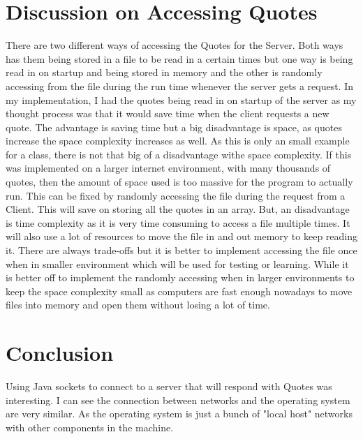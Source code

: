 \documentclass[twoside,twocolumn]{article}
\begin{document}

\section{Discussion on Accessing Quotes}
There are two different ways of accessing the Quotes for the Server. Both ways has them being stored in a file to be read in a certain times but one way is being read in on startup and being stored in memory and the other is randomly accessing from the file during the run time whenever the server gets a request. In my implementation, I had the quotes being read in on startup of the server as my thought process was that it would save time when the client requests a new quote. The advantage is saving time but a big disadvantage is space, as quotes increase the space complexity increases as well. As this is only an small example for a class, there is not that big of a disadvantage withe space complexity. If this was implemented on a larger internet environment, with many thousands of quotes, then the amount of space used is too massive for the program to actually run. This can be fixed by randomly accessing the file during the request from a Client. This will save on storing all the quotes in an array. But, an disadvantage is time complexity as it is very time consuming to access a file multiple times. It will also use a lot of resources to move the file in and out memory to keep reading it. There are always trade-offs but it is better to implement accessing the file once when in smaller environment which will be used for testing or learning. While it is better off to implement the randomly accessing when in larger environments to keep the space complexity small as computers are fast enough nowadays to move files into memory and open them without losing a lot of time.



\section{Conclusion}
Using Java sockets to connect to a server that will respond with Quotes was interesting. I can see the connection between networks and the operating system are very similar. As the operating system is just a bunch of "local host" networks with other components in the machine.



\printbibliography %
\end{document}
